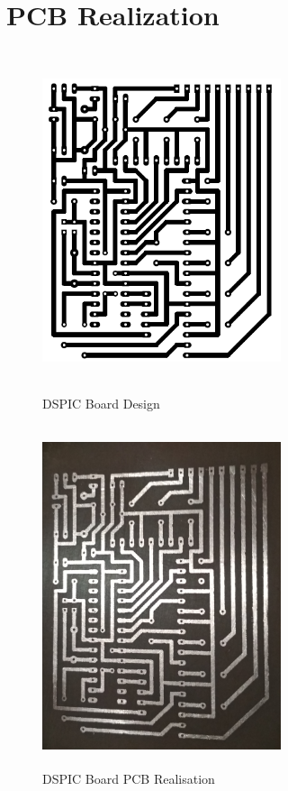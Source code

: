 \documentclass[12pt,a4paper]{report}
\begin{document}
\section{PCB Realization}

\begin{minipage}{8cm}
	\begin{figure}[H]
		\begin{center}
			\includegraphics[width=7cm,height=10cm]{figures/dsp1.png}
		\end{center}
			\caption{DSPIC Board Design}\label{DSP}
	\end{figure}
\end{minipage}
\begin{minipage}{8cm}
	\begin{figure}[H]
		\begin{center}
			\includegraphics[width=7cm,height=10cm]{figures/dsp1.jpg}
		\end{center}
			\caption{DSPIC Board PCB Realisation}\label{DSP1}
	\end{figure}
\end{minipage}
\end{document}
